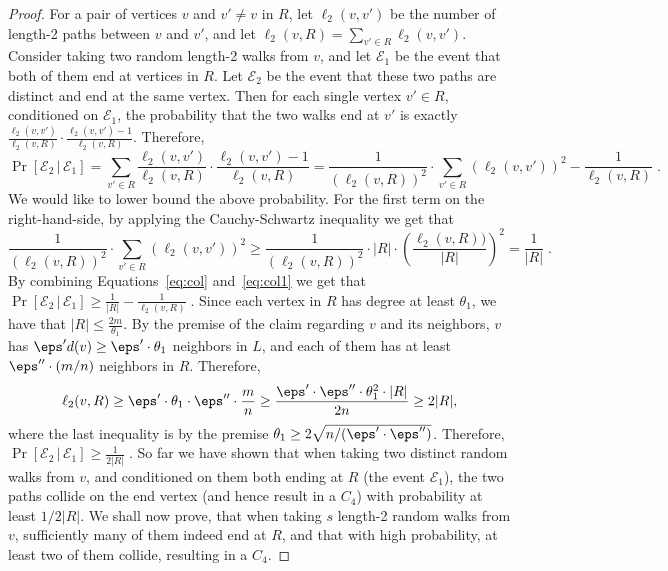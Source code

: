 \begin{proof}
For a pair of vertices $v$ and $v'\neq v$ in $R$, let $\ell_2(v,v')$ be the number of length-2 paths between $v$ and $v'$, and let $\ell_2(v,R) = \sum_{v'\in R} \ell_2(v,v')$.  Consider taking two random length-2 walks from $v$, and let $\mathcal{E}_1$ be the event that both of them end at vertices in $R$. Let $\mathcal{E}_2$ be the event that these two paths are distinct and end at the same vertex. Then for each single vertex $v'\in R$, conditioned on $\mathcal{E}_1$, the probability that the two walks end at $v'$ is exactly $\frac{\ell_2(v,v')}{\ell_2(v,R)}\cdot   \frac{\ell_2(v,v')-1}{\ell_2(v,R)}$.
Therefore,
\begin{equation} \label{eq:col}
\Pr[\mathcal{E}_2\,| \, \mathcal{E}_1] = \sum_{v'\in R} \frac{\ell_2(v,v')}{\ell_2(v,R)}\cdot   \frac{\ell_2(v,v')-1}{\ell_2(v,R)}
=  \frac{1}{(\ell_2(v,R))^2} \cdot \sum_{v'\in R} (\ell_2(v,v'))^2 - \frac{1}{\ell_2(v,R)}\;.
\end{equation}
We would like to lower bound the above probability.
For the first term on the right-hand-side, by applying the Cauchy-Schwartz inequality we get that
\begin{equation}\label{eq:col1}
\frac{1}{(\ell_2(v,R))^2} \cdot \sum_{v'\in R} (\ell_2(v,v'))^2 \geq  \frac{1}{(\ell_2(v,R))^2} \cdot |R| \cdot \left( \frac{\ell_2(v,R))}{|R|}\right)^2 = \frac{1}{|R|}\;.
\end{equation}
By combining Equations~\eqref{eq:col} and~\eqref{eq:col1} we get that
$\Pr[\mathcal{E}_2\,| \, \mathcal{E}_1] \geq \frac{1}{|R|} - \frac{1}{\ell_2(v,R)}\;.
$
Since each vertex in $R$ has degree at least $\theta_1$, we have that $|R| \leq \frac{2m}{\theta_1}$. 
By the premise of the claim regarding $v$ and its neighbors, $v$ has $\eps' d(v)\geq \eps'\cdot \theta_1$ neighbors in $L$, and each of them has 
at least $\eps''\cdot (m/n)$ neighbors in $R$. Therefore,
\begin{equation}
\ell_2(v,R) \geq \eps'\cdot \theta_1\cdot \eps''\cdot \frac{m}{n} 
 \geq \frac{\eps'\cdot \eps''\cdot \theta_1^2 \cdot |R|}{2n}\geq 2|R|,
\end{equation}
where the last inequality is by the premise $\theta_1 \geq 2\sqrt{n/(\eps'\cdot \eps'')}$. Therefore,
$\Pr[\mathcal{E}_2\,| \, \mathcal{E}_1] \geq \frac{1}{2|R|} \;.$
So far we have shown that when taking two distinct random walks from $v$, and conditioned on them both ending at $R$ (the event $\mathcal{E}_1$), the two paths collide on the end vertex (and hence result in a $C_4$) with probability at least $1/2|R|$. We shall now prove, 
that when taking $s$ length-2 random walks from $v$, sufficiently many of them indeed end at $R$, and that with high probability, at least two of them collide, resulting in a $C_4$.


\end{proof}
